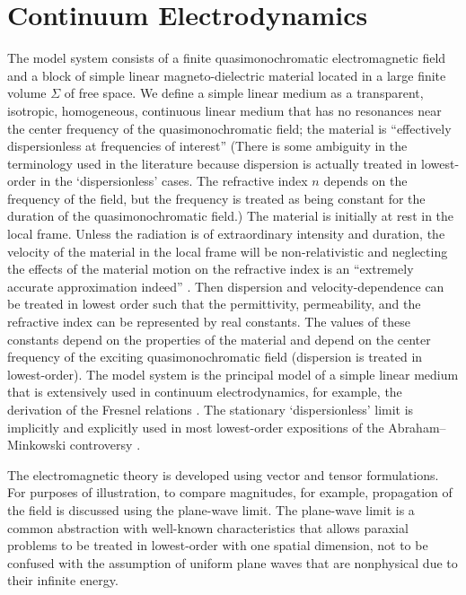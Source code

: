 \documentclass[twocolumn,amssymb,eqsecnum,aps,pra]{revtex4-2}
\begin{document}
\section{Continuum Electrodynamics}
\par
The model system consists of a finite quasimonochromatic 
electromagnetic field and a block of
simple linear magneto-dielectric material located in a
large finite volume ${\Sigma}$ of free space. 
We define a simple linear medium as a transparent, isotropic,
homogeneous, continuous linear medium that has no resonances
near the center frequency of the quasimonochromatic field;
the material is ``effectively dispersionless at frequencies of
interest'' \cite{BIBoydMil} (There is some ambiguity in the
terminology used in the literature because dispersion is actually
treated in lowest-order in the `dispersionless' cases.
The refractive index $n$ depends on the frequency of the field,
but the frequency is treated as being constant for the duration of
the quasimonochromatic field.)
The material is initially at rest in the local frame.
Unless the radiation is of extraordinary intensity and duration,
the velocity of the material in the local frame will be
non-relativistic and neglecting the effects of the material motion
on the refractive index is an ``extremely accurate approximation
indeed'' \cite{BIObukPLA}.
Then dispersion and velocity-dependence can be treated in lowest order
such that the permittivity, permeability, and the refractive index
can be represented by real constants.
The values of these constants depend on the properties of the material
and depend on the center frequency of the exciting quasimonochromatic
field (dispersion is treated in lowest-order).
The model system is the principal model of a simple linear medium
that is extensively used in continuum electrodynamics, for example,
the derivation of the Fresnel
relations \cite{BIJackson,BIGriff,BIZangwill}.
The stationary `dispersionless' limit is implicitly and explicitly
used in most lowest-order expositions of the Abraham--Minkowski
controversy \cite{BIBoydMil}.
\par
The electromagnetic theory is developed using vector and tensor
formulations.
For purposes of illustration, to compare magnitudes, for example,
propagation of the field is discussed using the plane-wave limit.
The plane-wave limit is a common abstraction with well-known
characteristics that allows paraxial problems to be treated
in lowest-order with one spatial dimension, not to be confused
with the assumption of uniform plane waves that are nonphysical
due to their infinite energy.
\end{document}

